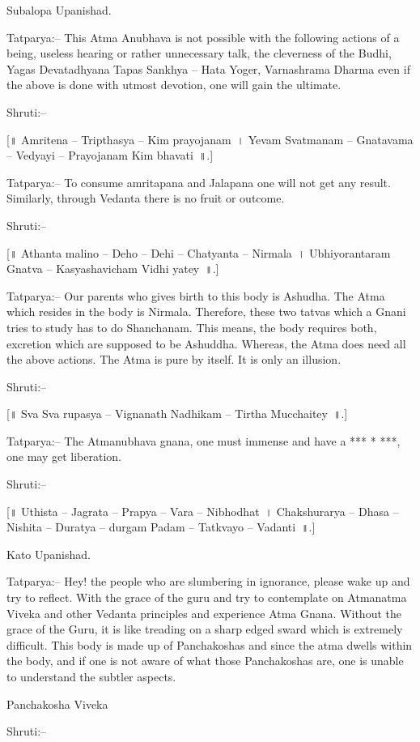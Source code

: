 Subalopa Upanishad.

Tatparya:– This Atma Anubhava is not possible with the following actions of a being, useless hearing or rather unnecessary talk, the cleverness of the Budhi, Yagas Devatadhyana Tapas Sankhya – Hata Yoger, Varnashrama Dharma even if the above is done with utmost devotion, one will gain the ultimate.

Shruti:–

[॥ Amritena – Tripthasya – Kim prayojanam~। Yevam Svatmanam – Gnatavama – Vedyayi – Prayojanam Kim bhavati~॥.]

Tatparya:– To consume amritapana and Jalapana one will not get any result. Similarly, through Vedanta there is no fruit or outcome.

Shruti:–

[॥ Athanta malino – Deho – Dehi – Chatyanta – Nirmala~। Ubhiyorantaram Gnatva – Kasyashavicham Vidhi yatey~॥.]

Tatparya:– Our parents who gives birth to this body is Ashudha. The Atma which resides in the body is Nirmala. Therefore, these two tatvas which a Gnani tries to study has to do Shanchanam. This means, the body requires both, excretion which are supposed to be Ashuddha. Whereas, the Atma does need all the above actions. The Atma is pure by itself. It is only an illusion.

Shruti:–

[॥ Sva Sva rupasya – Vignanath Nadhikam – Tirtha Mucchaitey~॥.]

Tatparya:– The Atmanubhava gnana, one must immense and have a *** * ***, one may get liberation.

Shruti:–

[॥ Uthista – Jagrata – Prapya – Vara – Nibhodhat~। Chakshurarya – Dhasa – Nishita – Duratya – durgam Padam – Tatkvayo – Vadanti~॥.]

Kato Upanishad.

Tatparya:– Hey! the people who are slumbering in ignorance, please wake up and try to reflect. With the grace of the guru and try to contemplate on Atmanatma Viveka and other Vedanta principles and experience Atma Gnana. Without the grace of the Guru, it is like treading on a sharp edged sward which is extremely difficult. This body is made up of Panchakoshas and since the atma dwells within the body, and if one is not aware of what those Panchakoshas are, one is unable to understand the subtler aspects.

Panchakosha Viveka

Shruti:–

